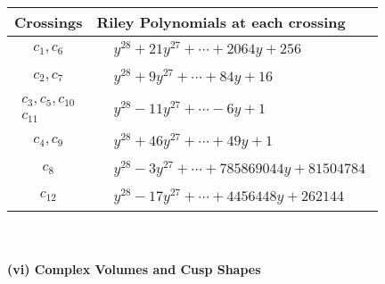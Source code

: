 \documentclass[1p]{elsarticle_modified}
\theoremstyle{definition}
\begin{document}
\begin{tabular}{m{50pt}|m{274pt}}
Crossings & \hspace{64pt}Riley Polynomials at each crossing \\
\hline $$\begin{aligned}c_{1},c_{6}\end{aligned}$$&$\begin{aligned}
&y^{28}+21 y^{27}+\cdots+2064 y+256
\end{aligned}$\\
\hline $$\begin{aligned}c_{2},c_{7}\end{aligned}$$&$\begin{aligned}
&y^{28}+9 y^{27}+\cdots+84 y+16
\end{aligned}$\\
\hline $$\begin{aligned}c_{3},c_{5},c_{10}\\c_{11}\end{aligned}$$&$\begin{aligned}
&y^{28}-11 y^{27}+\cdots-6 y+1
\end{aligned}$\\
\hline $$\begin{aligned}c_{4},c_{9}\end{aligned}$$&$\begin{aligned}
&y^{28}+46 y^{27}+\cdots+49 y+1
\end{aligned}$\\
\hline $$\begin{aligned}c_{8}\end{aligned}$$&$\begin{aligned}
&y^{28}-3 y^{27}+\cdots+785869044 y+81504784
\end{aligned}$\\
\hline $$\begin{aligned}c_{12}\end{aligned}$$&$\begin{aligned}
&y^{28}-17 y^{27}+\cdots+4456448 y+262144
\end{aligned}$\\
\hline
\end{tabular}\\~\\
\newpage\flushleft \textbf{(vi) Complex Volumes and Cusp Shapes}
\end{document}
